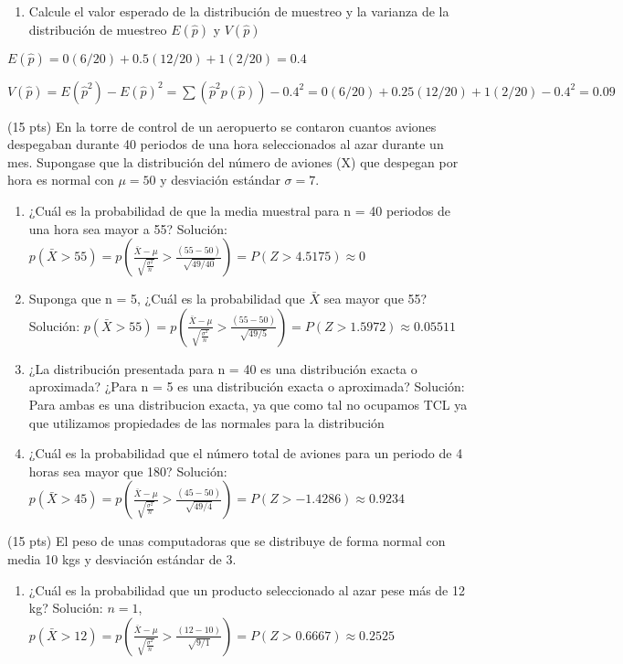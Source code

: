 \documentclass[addpoints]{exam}
\theoremstyle{mytheor}
\begin{document}
\begin{questions}
\begin{enumerate}
  \item Calcule el valor esperado de la distribución de muestreo y la varianza de la distribución de muestreo $E(\hat{p})$ y $V(\hat{p})$
  \end{enumerate}
  
  $E(\hat{p}) = 0(6/20)+0.5(12/20)+1(2/20) = 0.4$ 
  
  $V(\hat{p}) = E(\hat{p}^2) - E(\hat{p})^2 = \sum(\hat{p}^2 p(\hat{p})) - 0.4^2 = 0(6/20)+0.25(12/20)+1(2/20)- 0.4^2 = 0.09$
  
  \question (15 pts) 
  En la torre de control de un aeropuerto se contaron cuantos aviones despegaban durante 40 periodos de una hora seleccionados al azar durante un mes. Supongase que la distribución del número de aviones (X) que despegan por hora es normal con $\mu = 50$ y desviación estándar $\sigma=7$.
  
  \begin{enumerate}
  \item ¿Cuál es la probabilidad de que la media muestral para n = 40 periodos de una hora sea mayor a 55?
  \subitem Solución: $p(\bar{X}>55) = p(\frac{\bar{X}-\mu}{\sqrt{\frac{\sigma^2}{n}}}>\frac{(55-50)}{\sqrt{49/40}}) = P(Z>4.5175) \approx 0 $
  
  
  \item Suponga que n = 5, ¿Cuál es la probabilidad que $\bar{X}$ sea mayor que 55?
  \subitem Solución: $p(\bar{X}>55) = p(\frac{\bar{X}-\mu}{\sqrt{\frac{\sigma^2}{n}}}>\frac{(55-50)}{\sqrt{49/5}}) = P(Z>1.5972) \approx  0.05511$
  
  
  
  \item ¿La distribución presentada para n = 40 es una distribución exacta o aproximada? ¿Para n = 5 es una distribución exacta o aproximada?
    \subitem Solución: Para ambas es una distribucion exacta, ya que como tal no ocupamos TCL ya que utilizamos propiedades de las normales para la distribución
  
  \item ¿Cuál es la probabilidad que el número total de aviones para un periodo de 4 horas sea mayor que 180?
  \subitem Solución: $p(\bar{X}>45) = p(\frac{\bar{X}-\mu}{\sqrt{\frac{\sigma^2}{n}}}>\frac{(45-50)}{\sqrt{49/4}}) = P(Z>-1.4286) \approx  0.9234$
  
  \end{enumerate}

  \question (15 pts)
  El peso de unas computadoras que se distribuye de forma normal con media 10 kgs y desviación estándar de 3. 
  \begin{enumerate}
  \item ¿Cuál es la probabilidad que un producto seleccionado al azar pese más de 12 kg?
  \subitem Solución: $n = 1$, $p(\bar{X}>12) = p(\frac{\bar{X}-\mu}{\sqrt{\frac{\sigma^2}{n}}}>\frac{(12-10)}{\sqrt{9/1}}) = P(Z>0.6667) \approx  0.2525$
  

\end{enumerate}
\end{questions}
\end{document}
